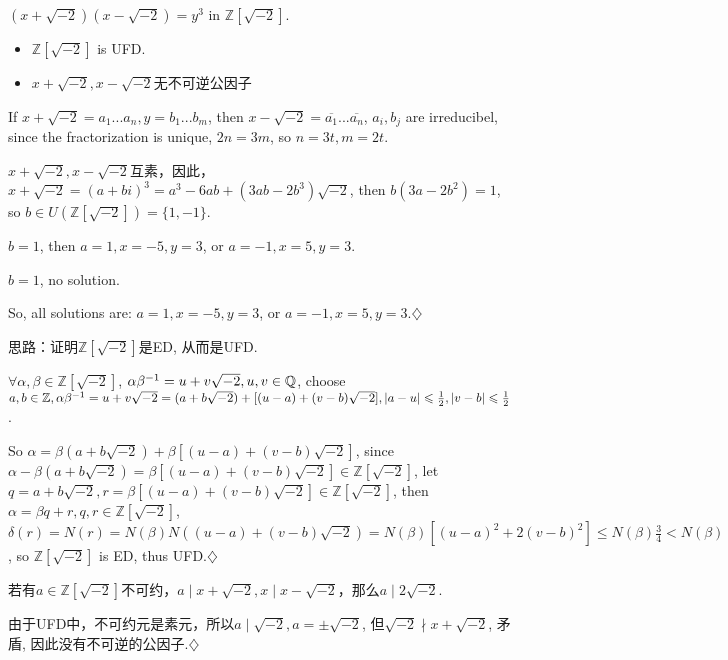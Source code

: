 \documentclass{report}
\begin{document}
\sol
{

    $(x+\sqrt{-2})(x-\sqrt{-2})=y^3$ in $\mathbb{Z}[\sqrt{-2}]$.

    \begin{itemize}
            \item $\mathbb{Z}[\sqrt{-2}]$ is UFD.
            \item $x+\sqrt{-2}, x-\sqrt{-2}$无不可逆公因子
    \end{itemize}
    

    If $x+\sqrt{-2}=a_1...a_n, y=b_1...b_m$, then $x-\sqrt{-2}=\overline{a_1}...\overline{a_n}$, $a_i, b_j$ are irreducibel, since the fractorization is unique, $2n=3m$, so $n=3t, m=2t$.

    $x+\sqrt{-2},x-\sqrt{-2}$互素，因此，$x+\sqrt{-2}=(a+bi)^3=a^3-6ab+(3ab-2b^3)\sqrt{-2}$, then $b(3a-2b^2)=1$, so $b\in U(\mathbb{Z}[\sqrt{-2}])=\{1,-1\}$.

    $b=1$, then $a=1, x=-5,y=3$, or $a=-1, x=5, y=3$.

    $b=1$, no solution.

    So, all solutions are: $a=1, x=-5,y=3$, or $a=-1, x=5, y=3$.$\diamondsuit$


    \begin{myproof}
        
        思路：证明$\mathbb{Z}[\sqrt{-2}]$是ED, 从而是UFD.

        $\forall \alpha, \beta \in \mathbb{Z}[\sqrt{-2}]$, $\alpha\beta^{-1}=u+v\sqrt{-2}, u,v \in \mathbb{Q}$, choose $a, b\in \mathbb{Z}, \alpha\beta^{-1}=u+v\sqrt{-2}= (a+b\sqrt{-2})+ [(u-a)+(v-b)\sqrt{-2}], |a-u| \leqslant \frac{1}{2}, |v-b| \leqslant \frac{1}{2}$.

        So $\alpha= \beta(a+b\sqrt{-2})+ \beta[(u-a)+(v-b)\sqrt{-2}]$, since $\alpha-\beta(a+b\sqrt{-2})= \beta[(u-a)+(v-b)\sqrt{-2}] \in \mathbb{Z}[\sqrt{-2}]$, let $q=a+b\sqrt{-2}, r= \beta[(u-a)+(v-b)\sqrt{-2}]  \in \mathbb{Z}[\sqrt{-2}]$, then $\alpha=\beta q +r, q,r \in \mathbb{Z}[\sqrt{-2}]$, $\delta(r)=N(r)=N(\beta)N((u-a)+(v-b)\sqrt{-2})=N(\beta)[(u-a)^2+2(v-b)^2]\leq N(\beta)\frac{3}{4}<N(\beta)$, so $\mathbb{Z}[\sqrt{-2}]$ is ED, thus UFD.$\diamondsuit$


    \end{myproof}


    \begin{myproof}
        
        若有$a\in \mathbb{Z}[\sqrt{-2}]$不可约，$a\mid x+\sqrt{-2}, x \mid x-\sqrt{-2}$，那么$a \mid 2\sqrt{-2}$.

        由于UFD中，不可约元是素元，所以$a \mid \sqrt{-2}, a= \pm \sqrt{-2}$, 但$\sqrt{-2} \nmid x+\sqrt{-2}$, 矛盾, 因此没有不可逆的公因子.$\diamondsuit$
    \end{myproof}
}
\end{document}
